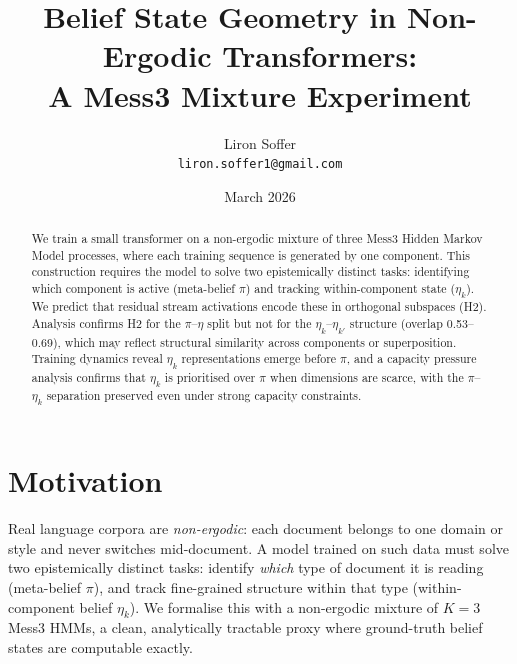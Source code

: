 \documentclass{article}
\title{Belief State Geometry in Non-Ergodic Transformers:\\
A Mess3 Mixture Experiment}
\author{Liron Soffer \\ \texttt{liron.soffer1@gmail.com}}
\date{March 2026}
\begin{document}
\maketitle

\begin{abstract}
We train a small transformer on a non-ergodic mixture of three Mess3 Hidden Markov
Model processes, where each training sequence is generated by one component.
This construction requires the model to solve two epistemically distinct tasks:
identifying which component is active (meta-belief $\pi$) and tracking
within-component state ($\eta_k$).
We predict that residual stream activations encode these in orthogonal subspaces (H2).
Analysis confirms H2 for the $\pi$--$\eta$ split but not for the
$\eta_k$--$\eta_{k'}$ structure (overlap 0.53--0.69), which may reflect
structural similarity across components or superposition.
Training dynamics reveal $\eta_k$ representations emerge before $\pi$,
and a capacity pressure analysis confirms that $\eta_k$ is prioritised over $\pi$
when dimensions are scarce, with the $\pi$--$\eta_k$ separation preserved even
under strong capacity constraints.
\end{abstract}

\tableofcontents
\newpage

\section{Motivation}
\label{sec:motivation}

Real language corpora are \emph{non-ergodic}: each document belongs to one
domain or style and never switches mid-document.
A model trained on such data must solve two epistemically distinct tasks:
identify \emph{which} type of document it is reading (meta-belief $\pi$),
and track fine-grained structure within that type (within-component belief $\eta_k$).
We formalise this with a non-ergodic mixture of $K=3$ Mess3 HMMs, a clean,
analytically tractable proxy where ground-truth belief states are computable
exactly.
\end{document}
